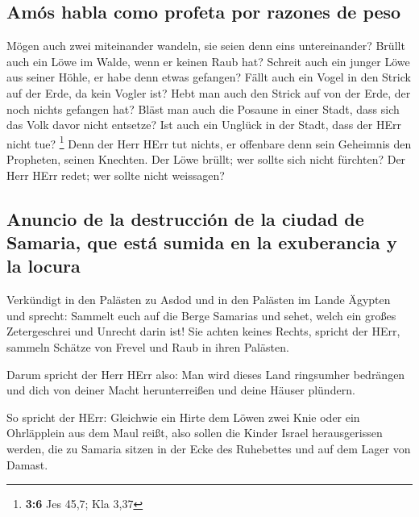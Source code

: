 \hypertarget{amuxf3s-habla-como-profeta-por-razones-de-peso}{%
\subsection{Amós habla como profeta por razones de
peso}\label{amuxf3s-habla-como-profeta-por-razones-de-peso}}

 Mögen auch zwei miteinander wandeln, sie seien denn eins
untereinander?  Brüllt auch ein Löwe im Walde, wenn er
keinen Raub hat? Schreit auch ein junger Löwe aus seiner Höhle, er habe
denn etwas gefangen?  Fällt auch ein Vogel in den Strick
auf der Erde, da kein Vogler ist? Hebt man auch den Strick auf von der
Erde, der noch nichts gefangen hat?  Bläst man auch die
Posaune in einer Stadt, dass sich das Volk davor nicht entsetze? Ist
auch ein Unglück in der Stadt, dass der HErr nicht tue? \footnote{\textbf{3:6}
  Jes 45,7; Kla 3,37}  Denn der Herr HErr tut nichts, er
offenbare denn sein Geheimnis den Propheten, seinen Knechten.
 Der Löwe brüllt; wer sollte sich nicht fürchten? Der Herr
HErr redet; wer sollte nicht weissagen?

\hypertarget{anuncio-de-la-destrucciuxf3n-de-la-ciudad-de-samaria-que-estuxe1-sumida-en-la-exuberancia-y-la-locura}{%
\subsection{Anuncio de la destrucción de la ciudad de Samaria, que está
sumida en la exuberancia y la
locura}\label{anuncio-de-la-destrucciuxf3n-de-la-ciudad-de-samaria-que-estuxe1-sumida-en-la-exuberancia-y-la-locura}}

 Verkündigt in den Palästen zu Asdod und in den Palästen
im Lande Ägypten und sprecht: Sammelt euch auf die Berge Samarias und
sehet, welch ein großes Zetergeschrei und Unrecht darin ist!
 Sie achten keines Rechts, spricht der HErr, sammeln
Schätze von Frevel und Raub in ihren Palästen.

 Darum spricht der Herr HErr also: Man wird dieses Land
ringsumher bedrängen und dich von deiner Macht herunterreißen und deine
Häuser plündern.

 So spricht der HErr: Gleichwie ein Hirte dem Löwen zwei
Knie oder ein Ohrläpplein aus dem Maul reißt, also sollen die Kinder
Israel herausgerissen werden, die zu Samaria sitzen in der Ecke des
Ruhebettes und auf dem Lager von Damast.

